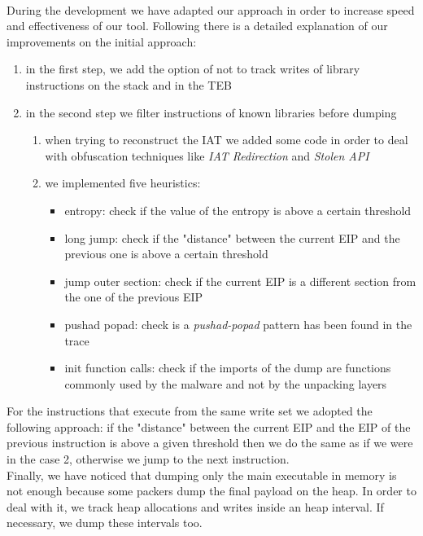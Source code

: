 \paragraph{}
During the development we have adapted our approach in order to increase speed and effectiveness of our tool. Following there is a detailed explanation of our improvements on the initial approach:
\begin{enumerate}
\item in the first step, we add the option of not to track writes of library instructions on the stack and in the TEB
\item in the second step we filter instructions of known libraries before dumping
	\begin{enumerate}
	\item when trying to reconstruct the \ac{IAT} we added some code in order to deal with 			obfuscation techniques like \textit{\ac{IAT} Redirection} and \textit{Stolen \ac{API}}
	\item we implemented five heuristics:
		\begin{itemize}
		\item entropy: check if the value of the entropy is above a certain threshold
		\item long jump: check if the "distance" between the current EIP and the previous 			one is above a certain threshold
		\item jump outer section: check if the current EIP is a different section from the 		one of the previous EIP
		\item pushad popad: check is a \textit{pushad-popad} pattern has been found in the trace
		\item init function calls: check if the imports of the dump are functions commonly 			 used by the malware and not by the unpacking layers
		\end{itemize}
	\end{enumerate}
\end{enumerate} 
For the instructions that execute from the same write set we adopted the following approach: if the "distance" between the current EIP and the EIP of the previous instruction is above a given threshold then we do the same as if we were in the case 2, otherwise we jump to the next instruction.\\
Finally, we have noticed that dumping only the main executable in memory is not enough because some packers dump the final payload on the heap. In order to deal with it, we track heap allocations and writes inside an heap interval. If necessary, we dump these intervals too.

